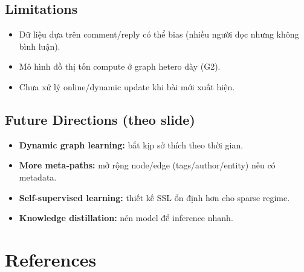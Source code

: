 \documentclass[11pt]{article}
\begin{document}
\subsection{Limitations}
\begin{itemize}
  \item Dữ liệu dựa trên comment/reply có thể bias (nhiều người đọc nhưng không bình luận).
  \item Mô hình đồ thị tốn compute ở graph hetero dày (G2).
  \item Chưa xử lý online/dynamic update khi bài mới xuất hiện.
\end{itemize}

\subsection{Future Directions (theo slide)}
\begin{itemize}
  \item \textbf{Dynamic graph learning:} bắt kịp sở thích theo thời gian.
  \item \textbf{More meta-paths:} mở rộng node/edge (tags/author/entity) nếu có metadata.
  \item \textbf{Self-supervised learning:} thiết kế SSL ổn định hơn cho sparse regime.
  \item \textbf{Knowledge distillation:} nén model để inference nhanh.
\end{itemize}

\section*{References}

\end{document}
